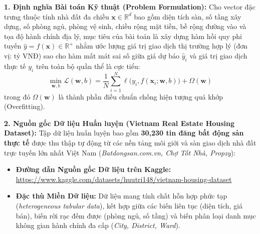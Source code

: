 \documentclass[12pt,a4paper]{report}
\begin{document}
\textbf{1. Định nghĩa Bài toán Kỹ thuật (Problem Formulation):}
Cho vector đặc trưng thuộc tính nhà đất đa chiều $\mathbf{x} \in \mathbb{R}^d$ bao gồm diện tích sàn, số tầng xây dựng, số phòng ngủ, phòng vệ sinh, chiều rộng mặt tiền, bề rộng đường vào và tọa độ hành chính địa lý, mục tiêu của bài toán là xây dựng hàm hồi quy phi tuyến $\hat{y} = f(\mathbf{x}) \in \mathbb{R}^+$ nhằm ước lượng giá trị giao dịch thị trường hợp lý (đơn vị: tỷ VNĐ) sao cho hàm mất mát sai số giữa giá dự báo $\hat{y}_i$ và giá trị giao dịch thực tế $y_i$ trên toàn bộ quần thể là cực tiểu:
\begin{equation}
\min_{\mathbf{w}, b} \mathcal{L}(\mathbf{w}, b) = \frac{1}{N} \sum_{i=1}^N \ell\big(y_i, f(\mathbf{x}_i; \mathbf{w}, b)\big) + \Omega(\mathbf{w})
\end{equation}
trong đó $\Omega(\mathbf{w})$ là thành phần điều chuẩn chống hiện tượng quá khớp (Overfitting).

\textbf{2. Nguồn gốc Dữ liệu Huấn luyện (Vietnam Real Estate Housing Dataset):}
Tập dữ liệu huấn luyện bao gồm \textbf{30,230 tin đăng bất động sản thực tế} được thu thập tự động từ các nền tảng môi giới và sàn giao dịch nhà đất trực tuyến lớn nhất Việt Nam (\textit{Batdongsan.com.vn, Chợ Tốt Nhà, Propzy}):
\begin{itemize}[leftmargin=1.5em]
    \item \textbf{Đường dẫn Nguồn gốc Dữ liệu trên Kaggle:} \url{https://www.kaggle.com/datasets/huutri148/vietnam-housing-dataset}
    \item \textbf{Đặc thù Miền Dữ liệu:} Dữ liệu mang tính chất hỗn hợp phức tạp (\textit{heterogeneous tabular data}), kết hợp giữa các biến liên tục (diện tích, giá bán), biến rời rạc đếm được (phòng ngủ, số tầng) và biến phân loại danh mục không gian hành chính đa cấp (\textit{City, District, Ward}).
\end{itemize}
\end{document}
